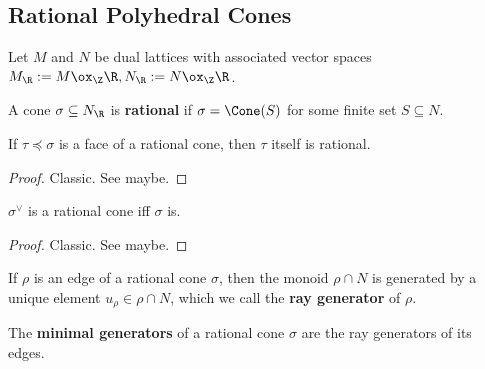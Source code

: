 \subsection{Rational Polyhedral Cones}


Let $M$ and $N$ be dual lattices with associated vector spaces $M_\R := M \ox_\Z \R, N_\R := N \ox_\Z \R$.


\begin{definition}
  \label{1-2-14-rat-cone}

  A cone $\sigma \subseteq N_\R$ is {\bf rational} if $\sigma = \Cone(S)$ for some finite set $S \subseteq N$.
\end{definition}


\begin{lemma}
  \label{1-2-14-face-rat-cone}

  If $\tau \preceq \sigma$ is a face of a rational cone, then $\tau$ itself is rational.
\end{lemma}
\begin{proof}

  Classic. See \cite{Oda_1988} maybe.
\end{proof}


\begin{lemma}
  \label{1-2-14-dual-rat-cone}

  $\sigma^\vee$ is a rational cone iff $\sigma$ is.
\end{lemma}
\begin{proof}

  Classic. See \cite{Oda_1988} maybe.
\end{proof}


\begin{definition}
  \label{1-2-ray-gen}

  If $\rho$ is an edge of a rational cone $\sigma$, then the monoid $\rho \cap N$ is generated by a unique element $u_\rho \in \rho \cap N$, which we call the {\bf ray generator} of $\rho$.
\end{definition}


\begin{definition}
  \label{1-2-min-gen}

  The {\bf minimal generators} of a rational cone $\sigma$ are the ray generators of its edges.
\end{definition}


